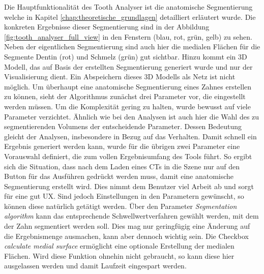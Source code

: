 Die Hauptfunktionalität des Tooth Analyser ist die anatomische Segmentierung welche
in Kapitel \ref{chap:theoretische_grundlagen} detailliert erläutert wurde. Die
konkreten Ergebnisse dieser Segmentierung sind in der Abbildung
\ref{fig:tooth_analyser_full_view} in den Fenstern (blau, rot, grün, gelb) zu sehen.
Neben der eigentlichen Segmentierung sind auch hier die medialen Flächen für die
Segmente Dentin (rot) und Schmelz (grün) gut sichtbar. Hinzu kommt ein \ac{3D}
Modell, das auf Basis der erstellten Segmentierung generiert wurde und nur der Visualisierung
dient. Ein Abspeichern dieses 3D Modells als Netz ist nicht möglich. Um überhaupt
eine anatomische Segmentierung eines Zahnes erstellen zu können, sieht der
Algorithmus zunächst drei Parameter vor, die eingestellt werden müssen. Um die
Komplexität gering zu halten, wurde bewusst auf viele Parameter verzichtet.
Ähnlich wie bei den Analysen ist auch hier die Wahl des zu segmentierenden
Volumens der entscheidende Parameter. Dessen Bedeutung gleicht der Analysen,
insbesondere in Bezug auf das Verhalten. Damit schnell ein Ergebnis generiert werden
kann, wurde für die übrigen zwei Parameter eine Vorauswahl definiert, die zum vollen
Ergebnisumfang des Tools führt. So ergibt sich die Situation, dass nach dem Laden
eines \ac{CT}s in die Szene nur auf den Button für das Ausführen gedrückt werden
muss, damit eine anatomische Segmentierung erstellt wird. Dies nimmt dem Benutzer
viel Arbeit ab und sorgt für eine gut \ac{UX}. Sind jedoch Einstellungen in den Parametern
gewünscht, so können diese natürlich getätigt werden. Über den Parameter \textit{Segmentation
algorithm} kann das entsprechende Schwellwertverfahren gewählt werden, mit dem der
Zahn segmentiert werden soll. Dies mag nur geringfügig eine Änderung auf die
Ergebnismenge ausmachen, kann aber dennoch wichtig sein. Die Checkbox \textit{calculate
medial surface} ermöglicht eine optionale Erstellung der medialen Flächen. Wird
diese Funktion ohnehin nicht gebraucht, so kann diese hier ausgelassen werden und
damit Laufzeit eingespart werden.


